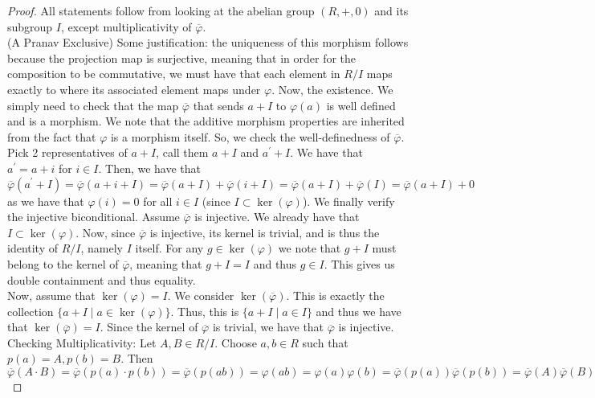 \begin{proof}
    All statements follow from looking at the abelian group $(R, +, 0)$ and its
    subgroup $I$, except multiplicativity of $\overline{\varphi}$. \\
    (A Pranav Exclusive) Some justification:
    the uniqueness of this morphism follows because the projection map is surjective, meaning that in
    order for the composition to be commutative, we must have that each element in $R / I$ maps exactly
    to where its associated element maps under $\varphi$. Now, the existence. We simply need to check that
    the map $\overline{\varphi}$ that sends $a + I$ to $\varphi(a)$ is well defined and is a morphism. We note that
    the additive morphism properties are inherited from the fact that $\varphi$ is a morphism itself. So, we check
    the well-definedness of $\overline{\varphi}$. Pick 2 representatives of $a + I$, call them $a + I$ and
    $a^\prime + I$. We have that $a^\prime = a + i$ for $i \in I$. Then, we have that
    $$
    \overline{\varphi}(a^\prime + I) = \overline{\varphi}(a + i + I) = \overline{\varphi}(a + I) + \overline{\varphi}(i + I) =
    \overline{\varphi}(a + I) + \overline{\varphi}(I) = \overline{\varphi}(a + I) + 0
    $$
    as we have that $\varphi(i) = 0$ for all $i \in I$ (since $I \subset \ker(\varphi)$). We finally verify the injective
    biconditional. Assume $\overline{\varphi}$ is injective. We already have that $I \subset \ker(\varphi)$.
    Now, since $\overline{\varphi}$ is injective, its kernel is trivial, and is thus the identity of $R / I$, namely $I$ itself.
    For any $g \in \ker(\varphi)$ we note that $g + I$ must belong to the kernel of $\overline{\varphi}$, meaning that
    $g + I = I$ and thus $g \in I$. This gives us double containment and thus equality. \\
    Now, assume that $\ker(\varphi) = I$. We consider $\ker(\overline{\varphi})$. This is exactly the collection
    $\{a + I \mid a \in \ker(\varphi) \}$. Thus, this is $\{a + I \mid a \in I\}$ and thus we have that
    $\ker(\overline{\varphi}) = I$. Since the kernel of $\overline{\varphi}$ is trivial, we have that
    $\overline{\varphi}$ is injective. \\
    Checking Multiplicativity: Let $A,B \in R/I$. Choose $a,b \in R$ such that $p(a) = A, p(b) = B$. Then
    $$
    \overline{\varphi}(A \cdot B) = \overline{\varphi}(p(a)\cdot p(b)) =
    \overline{\varphi}(p(ab)) = \varphi(ab) = \varphi(a)\varphi(b) =
    \overline{\varphi}(p(a))\overline{\varphi}(p(b)) = \overline{\varphi}(A)\overline{\varphi}(B)
    $$
\end{proof}
